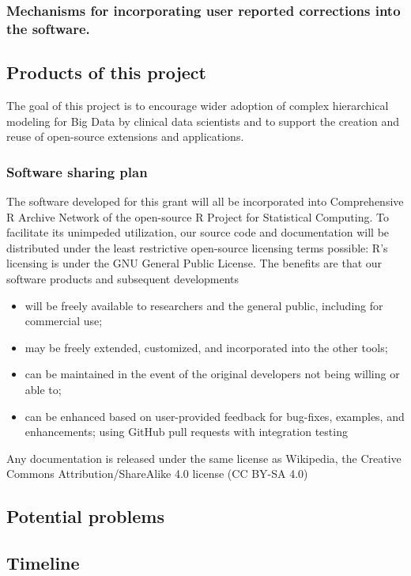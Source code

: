 \documentclass[11pt,notitlepage]{article}
\begin{document}
\subsubsection*{Mechanisms for incorporating user reported corrections into the software.}

\subsection*{Products of this project}
The goal of this project is to encourage wider adoption of complex hierarchical modeling for Big Data by clinical data scientists and to support the creation and reuse of open-source extensions and applications. 

\subsubsection*{Software sharing plan}
The software developed for this grant will all be incorporated into Comprehensive R Archive Network of the open-source R Project for Statistical Computing. To facilitate its unimpeded utilization, our source code and documentation will be distributed under the least restrictive open-source licensing terms possible: R's licensing is under the GNU General Public License. The benefits are that our software products and subsequent developments

\begin{itemize}
\item 
 will be freely available to researchers and the general public, including for commercial use; 
\item
 may be freely extended, customized, and incorporated into the other tools; 
\item 
can be maintained in the event of the original developers not being willing
or able to; 
\item 
can be enhanced based on user-provided feedback for bug-fixes, examples, and enhancements; using GitHub pull requests with integration testing
\end{itemize}

Any documentation is released under the same license as Wikipedia, the Creative Commons Attribution/ShareAlike 4.0 license (CC BY-SA 4.0)\cite{Creativecommonsorg2015}

\subsection*{Potential problems}
\subsection*{Timeline}
\end{document}
